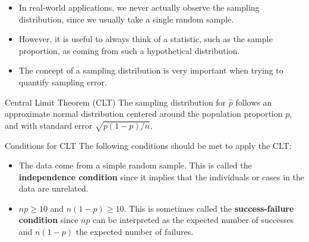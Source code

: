 \documentclass[11pt]{beamer}
\begin{document}
\begin{frame}
\begin{itemize}
\item In real-world applications, we never actually observe the sampling distribution, since we usually take a single random sample.
\vspace{10pt}
\item However, it is useful to always think of a statistic, such as the sample proportion, as coming from such a hypothetical distribution.
\vspace{10pt}
\item The concept of a sampling distribution is very important when trying to quantify sampling error.
\end{itemize}
\end{frame}

\begin{frame}{Central Limit Theorem (CLT)}
The sampling distribution for $\hat{p}$ follows an approximate normal distribution centered around the population proportion $p$, and with standard error $\sqrt{p (1-p) / n}$.\\
\vspace{4.5cm}

\end{frame}

\begin{frame}{Conditions for CLT}
The following conditions should be met to apply the CLT:\\
\vspace{5pt}
\begin{itemize}
\item The data come from a simple random sample.  This is called the \textbf{independence condition} since it implies that the individuals or cases in the data are unrelated.
\vspace{5pt}
\item $np \geq 10$ and $n(1-p) \geq 10$.  This is sometimes called the \textbf{success-failure condition}  since $np$ can be interpreted as the expected number of successes and $n(1-p)$ the expected number of failures.
\end{itemize}
\end{frame}
\end{document}
